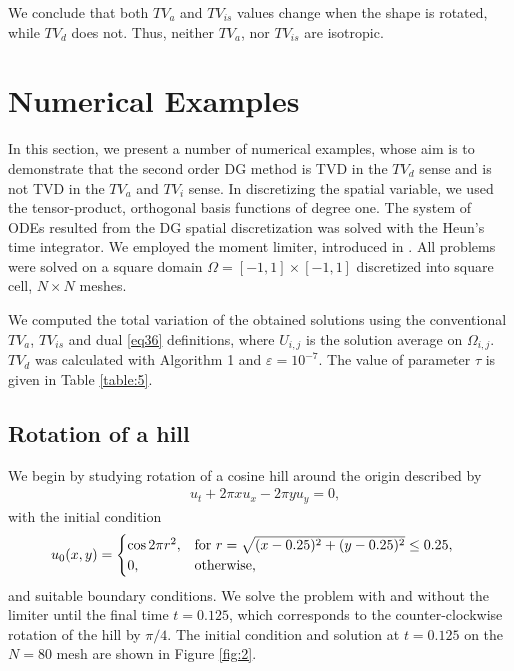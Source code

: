 \documentclass[reqno,a4paper,12pt]{amsart}
\begin{document}
We conclude that both $TV_a$ and $TV_{is}$ values change when the shape is rotated, while $TV_d$ does not. Thus, neither $TV_a$, nor $TV_{is}$ are isotropic. 

\section{Numerical Examples}

In this section, we present a number of numerical examples, whose aim is to demonstrate that the second order DG method is TVD in the $TV_d$ sense and is not TVD in the $TV_a$ and $TV_i$ sense. In discretizing the spatial variable, we used the tensor-product, orthogonal basis functions of degree one. The system of ODEs resulted from the DG spatial discretization was solved with the Heun's time integrator. We employed the moment limiter, introduced in \cite{Krivodonova2007}.  All problems were solved on a square domain $\Omega = [-1,1] \times [-1,1]$ discretized into square cell, $N \times N$ meshes. 

We computed the total variation of the obtained solutions using the conventional $TV_a$, $TV_{is}$ and dual \eqref{eq36} definitions, where $U_{i,j}$ is the solution average on $\Omega_{i,j}$. $TV_d$ was calculated with Algorithm 1 and $\varepsilon=10^{-7}$. The value of parameter $\tau$ is given in Table \ref{table:5}. 

\subsection{Rotation of a hill}

We begin by studying rotation of a cosine hill around the origin described by
\begin{align}
    &u_t + 2 \pi x u_x - 2 \pi y u_y = 0, \label{eq42a}
\end{align}
with the initial condition
\begin{align}
    &u_0(x,y) = \begin{cases} \cos{2 \pi r^2}, & \mbox{for } r = \sqrt{(x-0.25)^2 + (y-0.25)^2}\leq 0.25, \\ 0,  & \mbox{otherwise, } \end{cases} \hfill
    \label{eq42b}
\end{align}
and  suitable boundary conditions.  We solve the problem with and without the limiter until the final time $t = 0.125$, which corresponds to the counter-clockwise rotation of the hill by $\pi / 4$. The initial condition and solution at $t = 0.125$ on the $N = 80$ mesh are shown in Figure \ref{fig:2}.
\end{document}
